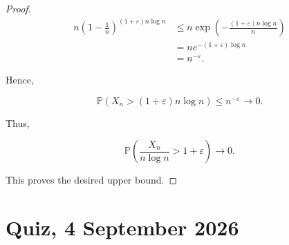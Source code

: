\begin{proof}
\[
\begin{aligned}
    n
    \left(
        1-\frac1n
    \right)^{(1+\varepsilon)n\log n}
    &\leq
    n
    \exp
    \left(
        -\frac{(1+\varepsilon)n\log n}{n}
    \right) \\
    &=
    n e^{-(1+\varepsilon)\log n} \\
    &=
    n^{-\varepsilon}.
\end{aligned}
\]

Hence,

\[
    \mathbb{P}
    \left(
        X_n>(1+\varepsilon)n\log n
    \right)
    \leq
    n^{-\varepsilon}
    \longrightarrow 0.
\]

Thus,

\[
    \mathbb{P}
    \left(
        \frac{X_n}{n\log n}>1+\varepsilon
    \right)
    \longrightarrow 0.
\]

This proves the desired upper bound.
\end{proof}


\lectureend



\section{Quiz, 4 September 2026}

